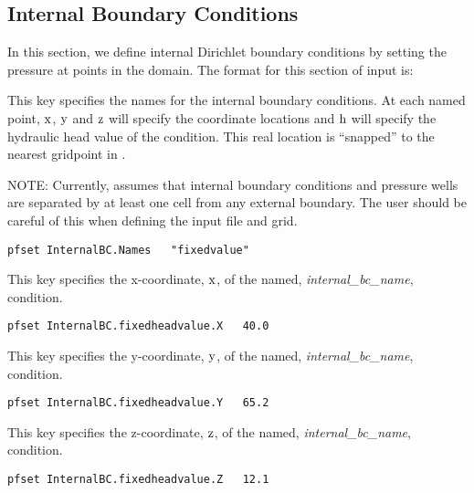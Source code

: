 
\subsection{Internal Boundary Conditions}
\label{Internal Boundary Conditions}

In this section, we define internal Dirichlet boundary conditions
by setting the pressure at points in the domain.
The format for this section of input is:

{
This key specifies the names for the internal boundary conditions.
At each named point, ${\rm x}$, ${\rm y}$ and ${\rm z}$ will specify
the coordinate locations and ${\rm h}$ will specify the hydraulic head
value of the condition.  This real location is ``snapped'' to the
nearest gridpoint in \parflow{}.

NOTE: Currently, \parflow{} assumes that internal boundary conditions
and pressure wells are separated by at least one cell from any external
boundary.  The user should be careful of this when defining the input
file and grid.
}
\begin{display}\begin{verbatim}
pfset InternalBC.Names   "fixedvalue"
\end{verbatim}\end{display}

{
This key specifies the x-coordinate, ${\rm x}$, of the named,
{\em internal\_bc\_name}, condition.
}
\begin{display}\begin{verbatim}
pfset InternalBC.fixedheadvalue.X   40.0
\end{verbatim}\end{display}

{
This key specifies the y-coordinate, ${\rm y}$, of the named,
{\em internal\_bc\_name}, condition.
}
\begin{display}\begin{verbatim}
pfset InternalBC.fixedheadvalue.Y   65.2
\end{verbatim}\end{display}

{
This key specifies the z-coordinate, ${\rm z}$, of the named,
{\em internal\_bc\_name}, condition.
}
\begin{display}\begin{verbatim}
pfset InternalBC.fixedheadvalue.Z   12.1
\end{verbatim}\end{display}

